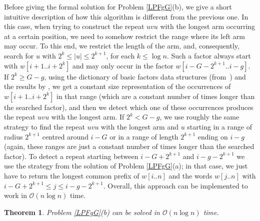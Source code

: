 \documentclass[final]{dmtcs-episciences}
\newcommand{\bigo}{{\mathcal O}}
\newtheorem{theorem}{Theorem}
\begin{document}
Before giving the formal solution for Problem \ref{LPFgG}(b), we give a short intuitive description of how this algorithm is different from the previous one. In this case, when trying to construct the repeat $uvu$ with the longest arm occurring at a certain position, we need to somehow restrict the range where its left arm may occur. To this end, we restrict the length of the arm, and, consequently, search for $u$ with $2^k\leq |u|\leq 2^{k+1}$, for each $k\leq \log n$. Such a factor always start with $w[i+1..i+2^k]$ and may only occur in the factor $w[i-G-2^{k+1}..i-g]$. If $2^k\geq G-g$, using the dictionary of basic factors data structures (from~\cite{DBF}) and the results by \cite{KociumakaSPIRE2012}, we get a constant size representation of the occurrences of $w[i+1..i+2^k]$ in that range (which are a constant number of times longer than the searched factor), and then we detect which one of these occurrences produces the repeat $uvu$ with the longest arm. If $2^k<G-g$, we use roughly the same strategy to find the repeat $uvu$ with the longest arm and $u$ starting in a range of radius $2^{k+1}$ centred around $i-G$ or in a range of length $2^{k+1}$ ending on $i-g$ (again, these ranges are just a constant number of times longer than the searched factor). To detect a repeat starting between $i-G+2^{k+1}$ and $i-g-2^{k+1}$ we use the strategy from the solution of Problem \ref{LPFgG}(a); in that case, we just have to return the longest common prefix of $w[i..n]$ and the words $w[j..n]$ with $i-G+2^{k+1}\leq j\leq i-g-2^{k+1}$. Overall, this approach can be implemented to work in $\bigo(n \log n)$ time.
\begin{theorem}\label{sol_LPFgG}
Problem \ref{LPFgG}(b) can be solved in $\bigo(n\log n)$ time.
\end{theorem}
\end{document}
